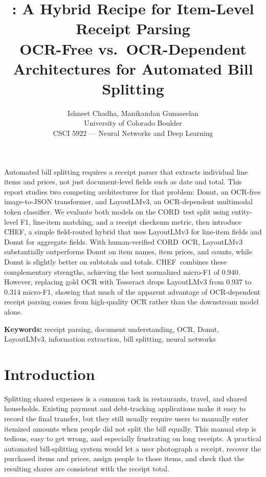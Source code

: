 \documentclass[9pt,twocolumn,twoside]{extarticle}
\title{%
  \vspace{-2em}%
  \textbf{\large \chef: A Hybrid Recipe for Item-Level Receipt Parsing}\\[3pt]
  {\small OCR-Free vs.\ OCR-Dependent Architectures for Automated Bill Splitting}%
  \vspace{-0.5em}%
}
\author{%
  Ishneet Chadha, Manikandan Gunaseelan\\[2pt]
  {\small University of Colorado Boulder}\\
  {\small CSCI 5922 --- Neural Networks and Deep Learning}
}
\date{}
\newcommand{\cord}{\textsc{CORD}}
\newcommand{\chef}{\textsc{CHEF}}
\begin{document}
\maketitle
\thispagestyle{plain}
\renewcommand\linenumberfont{\normalfont\scriptsize\color{gray}}
\setlength\linenumbersep{4pt}
\linenumbers

\leftlinenumbers
\begin{onecolabstract}
Automated bill splitting requires a receipt parser that extracts individual line items and prices, not just document-level fields such as date and total. This report studies two competing architectures for that problem: Donut, an OCR-free image-to-JSON transformer, and LayoutLMv3, an OCR-dependent multimodal token classifier. We evaluate both models on the \cord\ test split using entity-level F1, line-item matching, and a receipt checksum metric, then introduce \chef, a simple field-routed hybrid that uses LayoutLMv3 for line-item fields and Donut for aggregate fields. With human-verified \cord\ OCR, LayoutLMv3 substantially outperforms Donut on item names, item prices, and counts, while Donut is slightly better on subtotals and totals. \chef\ combines these complementary strengths, achieving the best normalized micro-F1 of 0.940. However, replacing gold OCR with Tesseract drops LayoutLMv3 from 0.937 to 0.314 micro-F1, showing that much of the apparent advantage of OCR-dependent receipt parsing comes from high-quality OCR rather than the downstream model alone.
\end{onecolabstract}
\switchlinenumbers

\smallskip
\noindent\textbf{Keywords:} receipt parsing, document understanding, OCR, Donut, LayoutLMv3, information extraction, bill splitting, neural networks
\medskip

\section{Introduction}
\label{sec:intro}

Splitting shared expenses is a common task in restaurants, travel, and shared households. Existing payment and debt-tracking applications make it easy to record the final transfer, but they still usually require users to manually enter itemized amounts when people did not split the bill equally. This manual step is tedious, easy to get wrong, and especially frustrating on long receipts. A practical automated bill-splitting system would let a user photograph a receipt, recover the purchased items and prices, assign people to those items, and check that the resulting shares are consistent with the receipt total.
\end{document}
